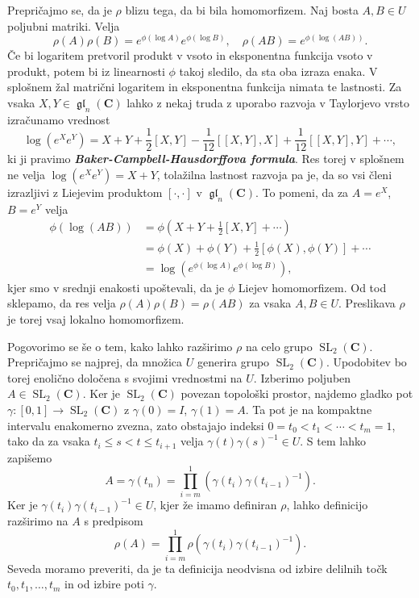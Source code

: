 \documentclass[11pt]{book}
\def\CC{\mathbf{C}}
\DeclareMathOperator\glfrak{\mathfrak{gl}}
\DeclareMathOperator\SL{SL}
\def\definicija{\color{rdeca}\bf\em}
\theoremstyle{definition}
\theoremstyle{zgled}
\theoremstyle{odprtproblem}
\theoremstyle{domacanaloga}
\theoremstyle{izrek}
\begin{document}
Prepričajmo se, da je $\rho$ blizu tega, da bi bila homomorfizem. Naj bosta $A,B \in U$ poljubni matriki. Velja
\[
    \rho(A) \rho(B) = e^{\phi(\log A)} e^{\phi(\log B)}, \quad
    \rho(AB) = e^{\phi(\log(AB))}.
\]
Če bi logaritem pretvoril produkt v vsoto in eksponentna funkcija vsoto v produkt, potem bi iz linearnosti $\phi$ takoj sledilo, da sta oba izraza enaka. V splošnem žal matrični logaritem in eksponentna funkcija nimata te lastnosti. Za vsaka $X,Y \in \glfrak_n(\CC)$ lahko z nekaj truda z uporabo razvoja v Taylorjevo vrsto izračunamo vrednost
\[
    \log(e^X e^Y) = X + Y + \frac{1}{2} [X,Y] - \frac{1}{12}[[X,Y],X] + \frac{1}{12} [[X,Y], Y] + \cdots,
\]
ki ji pravimo {\definicija Baker-Campbell-Hausdorffova formula}. Res torej v splošnem ne velja $\log(e^X e^Y) = X+Y$, tolažilna lastnost razvoja pa je, da so vsi členi izrazljivi z Liejevim produktom $[\cdot,\cdot]$ v $\glfrak_n(\CC)$. To pomeni, da za $A = e^X$, $B = e^Y$ velja
\begin{align*}
    \phi(\log(AB)) 
    &= \phi \left( X + Y + \frac{1}{2}[X,Y] + \cdots \right) \\
    &= \phi(X) + \phi(Y) + \frac{1}{2}[\phi(X), \phi(Y)] + \cdots \\
    &= \log(e^{\phi(\log A)} e^{\phi(\log B)}),
\end{align*}
kjer smo v srednji enakosti upoštevali, da je $\phi$ Liejev homomorfizem. Od tod sklepamo, da res velja $\rho(A)\rho(B) = \rho(AB)$ za vsaka $A,B \in U$. Preslikava $\rho$ je torej vsaj lokalno homomorfizem. 

Pogovorimo se še o tem, kako lahko razširimo $\rho$ na celo grupo $\SL_2(\CC)$. Prepričajmo se najprej, da množica $U$ generira grupo $\SL_2(\CC)$. Upodobitev bo torej enolično določena s svojimi vrednostmi na $U$. Izberimo poljuben $A \in \SL_2(\CC)$. Ker je $\SL_2(\CC)$ povezan topološki prostor, najdemo gladko pot $\gamma \colon [0,1] \to \SL_2(\CC)$ z $\gamma(0) = I$, $\gamma(1) = A$. Ta pot je na kompaktne intervalu enakomerno zvezna, zato obstajajo indeksi $0 = t_0 < t_1 < \cdots < t_m = 1$, tako da za vsaka $t_i \leq s < t \leq t_{i+1}$ velja $\gamma(t) \gamma(s)^{-1} \in U$. S tem lahko zapišemo
\[
    A = \gamma(t_n)
    = \prod_{i = m}^1 \left( \gamma(t_i) \gamma(t_{i-1})^{-1} \right).
\]
Ker je $\gamma(t_i) \gamma(t_{i-1})^{-1} \in U$, kjer že imamo definiran $\rho$, lahko definicijo razširimo na $A$ s predpisom
\[
    \rho(A) = \prod_{i = m}^{1} \rho \left( \gamma(t_i) \gamma(t_{i-1})^{-1} \right).
\]
Seveda moramo preveriti, da je ta definicija neodvisna od izbire delilnih točk $t_0, t_1, \dots, t_m$ in od izbire poti $\gamma$. 
\end{document}
